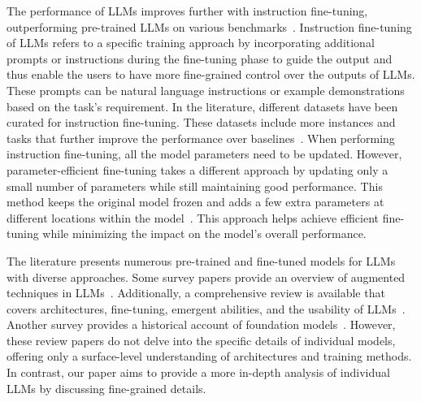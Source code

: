 The performance of LLMs improves further with instruction fine-tuning, outperforming pre-trained LLMs on various benchmarks~\cite{T0, mT0andBLOOMZ}. Instruction fine-tuning of LLMs refers to a specific training approach by incorporating additional prompts or instructions during the fine-tuning phase to guide the output and thus enable the users to have more fine-grained control over the outputs of LLMs. These prompts can be natural language instructions or example demonstrations based on the task's requirement. In the literature, different datasets have been curated for instruction fine-tuning. These datasets include more instances and tasks that further improve the performance over baselines~\cite{OPT_IML,mT0andBLOOMZ,Flan,Tk-INSTRUCT}. When performing instruction fine-tuning, all the model parameters need to be updated. However, parameter-efficient fine-tuning takes a different approach by updating only a small number of parameters while still maintaining good performance. This method keeps the original model frozen and adds a few extra parameters at different locations within the model~\cite{LMAdapted, LMAdapter_2, LMAdapter_3, Prompt_Tuning, Prefix_Tuning}. This approach helps achieve efficient fine-tuning while minimizing the impact on the model's overall performance.



The literature presents numerous pre-trained and fine-tuned models for LLMs with diverse approaches. Some survey papers provide an overview of augmented techniques in LLMs~\cite{survey_1}. Additionally, a comprehensive review is available that covers architectures, fine-tuning, emergent abilities, and the usability of LLMs~\cite{Survey_LLM}. Another survey provides a historical account of foundation models~\cite{survey_2}. However, these review papers do not delve into the specific details of individual models, offering only a surface-level understanding of architectures and training methods. In contrast, our paper aims to provide a more in-depth analysis of individual LLMs by discussing fine-grained details.


